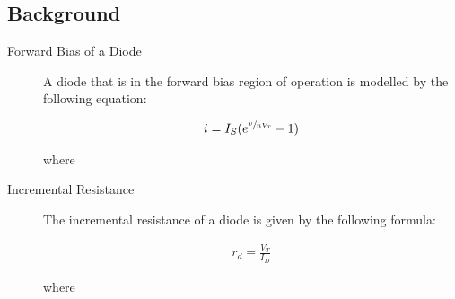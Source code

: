 \documentclass{article}
\begin{document}
\subsection{Background}
\label{definitions}
\begin{description}
\item[Forward Bias of a Diode]
A diode that is in the forward bias region of operation is modelled by the following equation:

\begin{align}
i = I_{S}(e^{\sfrac{v}{nV_T}} - 1)
\end{align}

where


\newpage

\item[Incremental Resistance]
The incremental resistance of a diode is given by the following formula:

\begin{align}
r_d = \frac{V_T}{I_D}
\end{align}

where


\end{description} 
 
\end{document}
